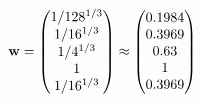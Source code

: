 \documentclass[10pt,a4paper]{article}
\begin{document}
	\[
		\bold{w} = 
		\begin{pmatrix}
			{1} / {{128^ {1 / 3}}} \\
			{1} / {{16^ {1 / 3}}} \\
			{1} / {{4^ {1 / 3}}} \\
			{1}{} \\
			{1} / {{16^ {1 / 3}}} \\
		\end{pmatrix}
		\approx
		\begin{pmatrix}
			0.1984   \\
			0.3969   \\
			0.63     \\
			1        \\
			0.3969   \\
		\end{pmatrix}
	\]
\end{document}
